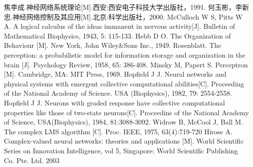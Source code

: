 \documentclass{hitszthesis}
\begin{document}
\begin{thebibliography}{99}


 焦李成.神经网络系统理论[M].西安:西安电子科技大学出版社，1991.
 何玉彬，李新忠.神经网络控制及其应用[M].北京:科学出版社，2000.
 McCulloch W S, Pitts W A. A logical calculus of the ideas immanent in nervous activity[J]. Bulletin of Mathematical Biophysics, 1943, 5: 115-133.
 Hebb D O. The Organization of Behaviour [M]. New York, John Wiley\&Sons Inc., 1949.
 Rosenblatt. The perception: a probabilistic model for information storage and organization in the brain [J]. Psychology Review, 1958, 65: 386-408.
 Minsky M, Papert S. Perceptron [M]. Cambridge, MA: MIT Press, 1969.
 Hopf\/ield  J  J.  Neural  networks  and  physical  systems  with  emergent  collective computational  abilities[C].  Proceeding  of the National Academy  of  Science.  USA (Biophysics), 1982, 79: 2554-2558.
 Hopf\/ield J J. Neurons with graded response have collective computational properties like those  of  two-state  neurons[C].  Proceedins  of  the  National  Academy  of  Science, USA(Biophysics), 1984, 81:3088-3092.
 Widrow B, McCool J, Ball M. The complex LMS algorithm [C]. Proc. IEEE, 1975, 63(4):719-720
 Hirose  A.  Complex-valued  neural  networks:  theories  and  applications  [M].  World Scientif\/ic Series on Innovation Intelligence, vol 5, Singapore: World Scientif\/ic Publishing Co. Pte. Ltd. 2003


\end{thebibliography}
\end{document}
